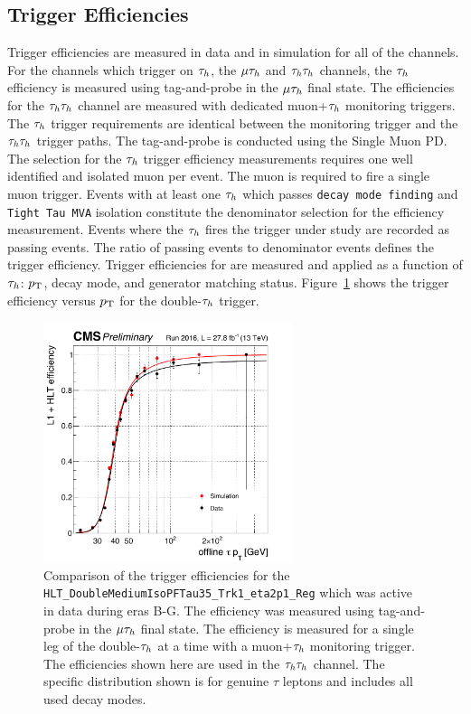\subsection{Trigger Efficiencies}
Trigger efficiencies are measured in data and in simulation for all of the channels. For the channels
which trigger on $\tau_{h}$, the $\mu\tau_{h}$ and $\tau_{h}\tau_{h}$ channels, the $\tau_{h}$ efficiency is measured
using tag-and-probe in the $\mu\tau_{h}$ final state. The efficiencies for the $\tau_{h}\tau_{h}$ channel
are measured with dedicated muon+$\tau_{h}$ monitoring triggers. The $\tau_{h}$ trigger requirements
are identical between the monitoring trigger and the $\tau_{h}\tau_{h}$ trigger paths. The tag-and-probe
is conducted using the Single Muon PD. The selection for the $\tau_{h}$ trigger efficiency measurements 
requires one well identified and isolated muon per event. The muon is required to fire a single muon trigger.
Events with at least one $\tau_{h}$ which passes \texttt{decay mode finding} and \texttt{Tight Tau MVA} isolation
constitute the denominator selection for the efficiency measurement. Events where the $\tau_{h}$
fires the trigger under study are recorded as passing events. The ratio of passing events to
denominator events defines the trigger efficiency. Trigger efficiencies for are measured and applied as 
a function of $\tau_{h}$: $p_\mathrm{T}$, decay mode, and generator matching status. Figure~\ref{fig:htt_tt_trig}
shows the trigger efficiency versus $p_\mathrm{T}$ for the double-$\tau_{h}$ trigger.

\begin{figure}[!htbp]
\centering
     \includegraphics[width=0.65\textwidth]{higgs_to_taus/plots/htt_tautau_trigger_efficiency.pdf}
     \caption{
Comparison of the trigger efficiencies for the \texttt{HLT\_DoubleMediumIsoPFTau35\_Trk1\_eta2p1\_Reg}
which was active in data during eras B-G. The efficiency was measured using tag-and-probe in the
$\mu\tau_{h}$ final state. The efficiency is measured for a single leg of the double-$\tau_{h}$ at a time
with a muon+$\tau_{h}$ monitoring trigger. The efficiencies shown here are used in the $\tau_{h}\tau_{h}$ channel.
The specific distribution shown is for genuine $\tau$ leptons and includes all used decay modes.
}
     \label{fig:htt_tt_trig}
\end{figure}

